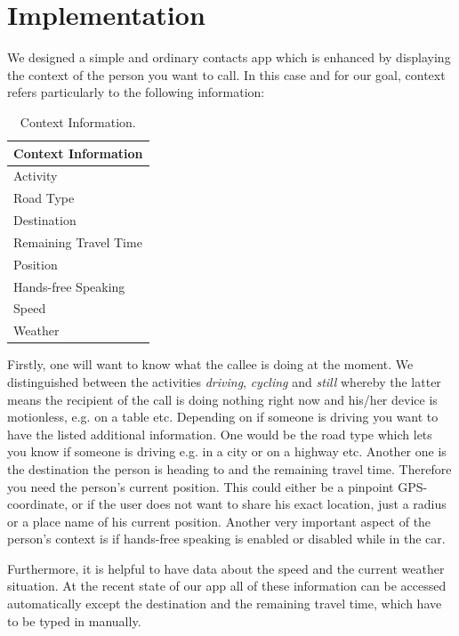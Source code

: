 \documentclass{sigchi}
\begin{document}
\section{Implementation}

We designed a simple and ordinary contacts app which is enhanced by displaying the context of the person you want to call. In this case and for our goal, context refers particularly to the following information:
\newline

\begin{center}
\begin{table}[htbp]
\begin{center}
\begin{tabular}[center]{l}
\toprule
Context Information\\
\midrule
Activity \\
Road Type \\
Destination \\
Remaining Travel Time \\
Position \\
Hands-free Speaking \\
Speed \\
Weather \\
\bottomrule
\end{tabular}
\end{center}
\caption[Context Information]{Context Information.\label{tab:cont}}
\end{table}
\end{center}

Firstly, one will want to know what the callee is doing at the moment. We distinguished between the activities \textit{driving}, \textit{cycling} and \textit{still} whereby the latter means the recipient of the call is doing nothing right now and his/her device is motionless, e.g. on a table etc. Depending on if someone is driving you want to have the listed additional information. One would be the road type which lets you know if someone is driving e.g. in a city or on a highway etc. Another one is the destination the person is heading to and the remaining travel time. Therefore you need the person's current position. This could either be a pinpoint GPS-coordinate, or if the user does not want to share his exact location, just a radius or a place name of his current position. Another very important aspect of the person's context is if hands-free speaking is enabled or disabled while in the car. 

Furthermore, it is helpful to have data about the speed and the current weather situation. At the recent state of our app all of these information can be accessed automatically except the destination and the remaining travel time, which have to be typed in manually.
\end{document}
